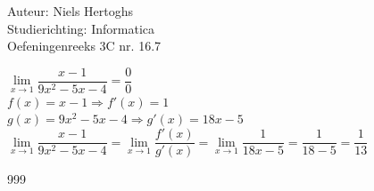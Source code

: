 \documentclass[a4paper]{article}
\begin{document}
\noindent \large Auteur: Niels Hertoghs\\
\noindent \large Studierichting: Informatica \\
\noindent \large Oefeningenreeks 3C nr. 16.7 \\

\medskip

\normalsize

$\lim\limits_{x \to 1} \dfrac{x - 1}{9x^2 - 5x - 4} = \dfrac{0}{0}$ \\

$f(x) = x - 1 \Rightarrow f'(x) = 1$ \\

$g(x) = 9x^2 - 5x - 4 \Rightarrow g'(x) = 18x - 5$ \\

$\lim\limits_{x \to 1} \dfrac{x - 1}{9x^2 - 5x - 4} = \lim\limits_{x \to 1} \dfrac{f'(x)}{g'(x)} = \lim\limits_{x \to 1} \dfrac{1}{18x - 5} = \dfrac{1}{18 - 5} = \dfrac{1}{13}$ \\

\begin{thebibliography}{999}
\end{thebibliography}
\end{document}
